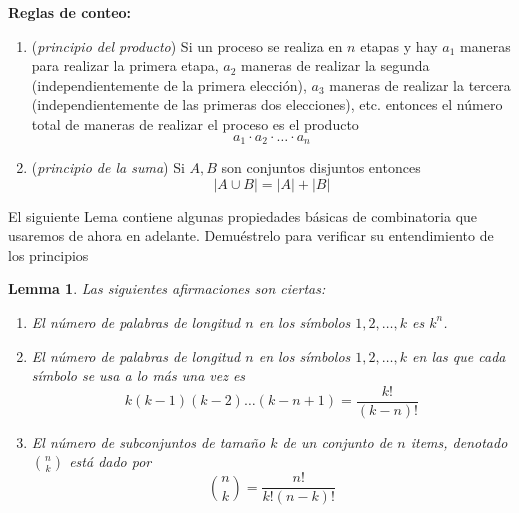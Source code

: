 \documentclass[12pt]{amsart}
\newtheorem{lemma}{Lemma}[section]
\theoremstyle{definition}
\begin{document}
{\bf Reglas de conteo:}
\begin{enumerate}
\item (\emph{principio del producto}) Si un proceso se realiza en $n$ etapas y hay $a_1$ maneras para realizar la primera etapa, $a_2$ maneras de realizar la segunda (independientemente de la primera elección), $a_3$ maneras de realizar la tercera (independientemente de las primeras dos elecciones), etc. entonces el número total de maneras de realizar el proceso es el producto
\[a_1\cdot a_2\cdot\dots \cdot a_n\] 
\item (\emph{principio de la suma}) Si $A,B$ son conjuntos disjuntos entonces 
\[|A\cup B|=|A|+|B|\]
\end{enumerate}
\noindent 
El siguiente Lema contiene algunas propiedades básicas de combinatoria que usaremos de ahora en adelante. Demuéstrelo para verificar su entendimiento de los principios

\begin{lemma} Las siguientes afirmaciones son ciertas:
\begin{enumerate}
\item El número de palabras de longitud $n$ en los símbolos $1,2,\dots,k$ es $k^n$.
\item El número de palabras de longitud $n$ en los símbolos $1,2,\dots,k$ en las que cada símbolo se usa a lo más una vez es
\[k(k-1)(k-2)\dots (k-n+1)=\frac{k!}{(k-n)!}\]

\item El número de subconjuntos de tamaño $k$ de un conjunto de $n$ items, denotado $\binom{n}{k}$ está dado por
\[\binom{n}{k}=\frac{n!}{k!(n-k)!}\]
\end{enumerate}

\end{lemma}
\end{document}
